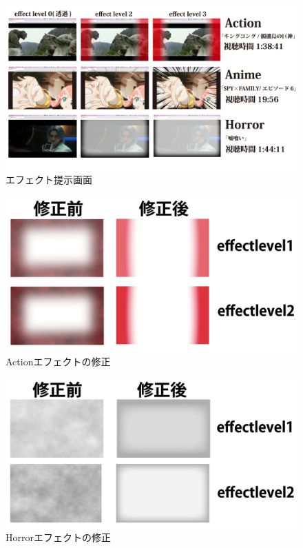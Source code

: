 \begin{figure}[H]
   \centering
   \includegraphics[width=16cm]{images/chapter3/efects.jpg}
   \caption{エフェクト提示画面}
   \label{efectteiji}
\end{figure}
 
\begin{figure}[H]
   \centering
   \includegraphics[width=16cm]{images/chapter3/actionberore.jpg}
   \caption{Actionエフェクトの修正}
   \label{actionbefore}
\end{figure}
 
\begin{figure}[H]
   \centering
   \includegraphics[width=16cm]{images/chapter3/horrorbefore.jpg}
   \caption{Horrorエフェクトの修正}
   \label{horrorbefore}
\end{figure}